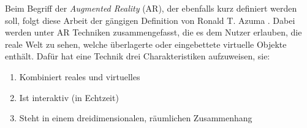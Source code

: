 Beim Begriff der \textit{Augmented Reality} (AR), der ebenfalls kurz definiert werden soll, folgt diese Arbeit der gängigen Definition von Ronald T. Azuma \cite{Azuma97}. Dabei werden unter AR Techniken zusammengefasst, die es dem Nutzer erlauben, die reale Welt zu sehen, welche überlagerte oder eingebettete virtuelle Objekte enthält. Dafür hat eine Technik drei Charakteristiken aufzuweisen, sie:
\begin{enumerate}
	\setlength{\itemsep}{-5pt}
	\item Kombiniert reales und virtuelles
	\item Ist interaktiv (in Echtzeit)
	\item Steht in einem dreidimensionalen, räumlichen Zusammenhang
\end{enumerate}

